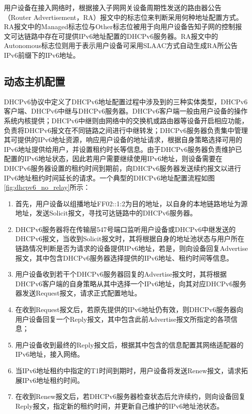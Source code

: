   用户设备在接入网络时，根据接入子网网关设备周期性发送的路由器公告（Router Advertisement，RA）报文\cite{RFC2461,RFC5175}中的标志位来判断采用何种地址配置方式。RA报文中的Managed标志位与Other标志位被用于向用户设备告知子网的控制报文可达链路中存在可提供IPv6地址配置的DHCPv6服务器。RA报文中的Autonomous标志位则用于表示用户设备可采用SLAAC方式自动生成RA所公告IPv6前缀下的IPv6地址。

    \subsection{动态主机配置}
    \label{survey:configuration:DHCPv6}
    DHCPv6协议\cite{RFC8415}中定义了DHCPv6地址配置过程中涉及到的三种实体类型，DHCPv6客户端、DHCPv6中继与DHCPv6服务器。DHCPv6客户端一般由用户设备的操作系统内核提供；DHCPv6中继则由网络中的交换机或路由器等设备开启相应功能，负责将DHCPv6报文在不同链路之间进行中继转发；DHCPv6服务器负责集中管理其可提供的IPv6地址资源，响应用户设备的地址请求，根据自身策略选择可用的IPv6地址提供给用户，并设置租约时长等信息。由于DHCPv6服务器负责维护已配置的IPv6地址状态，因此若用户需要继续使用IPv6地址，则设备需要在DHCPv6服务器设置的租约时间到期前，向DHCPv6服务器发送续约报文以进行IPv6地址租约时间延长的请求。一个典型的DHCPv6地址配置流程如图\ref{fig:dhcpv6_no_relay}所示：
    \begin{enumerate}[1{)}]
      \item 首先，用户设备以组播地址FF02::1:2为目的地址，以自身的本地链路地址为源地址，发送Solicit报文，寻找可达链路中的DHCPv6服务器。
      \item DHCPv6服务器将在传输层547号端口监听用户设备或DHCPv6中继发送的DHCPv6报文，当收到Solicit报文时，其将根据自身的地址池状态与用户所在链路情况判断是否为请求的设备提供IPv6地址，若是，则向设备回复Advertise报文，其中包含DHCPv6服务器选择提供的IPv6地址、租约时间等信息。
      \item 用户设备收到若干个DHCPv6服务器回复的Advertise报文时，其将根据DHCPv6客户端的自身策略从其中选择一个IPv6地址，向其对应DHCPv6服务器发送Request报文，请求正式配置地址。
      \item 在收到Request报文后，若原先提供的IPv6地址仍有效，则DHCPv6服务器向用户设备回复一个Reply报文，其中包含此前Advertise报文所指定的各项信息；
      \item 用户设备收到最终的Reply报文后，根据其中包含的信息配置其网络适配器的IPv6地址，接入网络。
      \item 当IPv6地址租约中指定的T1时间到期时，用户设备将发送Renew报文，请求拓展IPv6地址租约时间。
      \item 在收到Renew报文后，若DHCPv6服务器检查状态后允许续约，则向设备回复Reply报文，指定新的租约时间，并更新自己维护的IPv6地址池状态。
    \end{enumerate}

